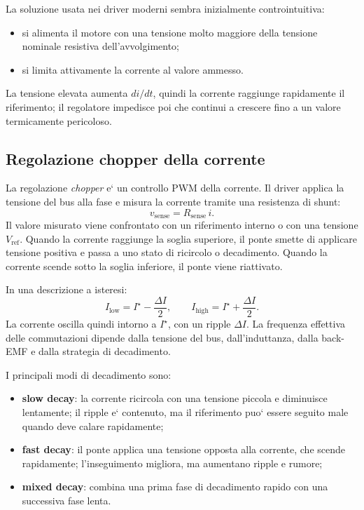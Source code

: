 \documentclass[11pt,a4paper]{article}
\begin{document}
La soluzione usata nei driver moderni sembra inizialmente controintuitiva:
\begin{itemize}
\item si alimenta il motore con una tensione molto maggiore della tensione nominale resistiva dell'avvolgimento;
\item si limita attivamente la corrente al valore ammesso.
\end{itemize}
La tensione elevata aumenta \(di/dt\), quindi la corrente raggiunge rapidamente il riferimento; il regolatore impedisce poi che continui a crescere fino a un valore termicamente pericoloso.

\subsection{Regolazione chopper della corrente}

La regolazione \emph{chopper} e` un controllo PWM della corrente. Il driver applica la tensione del bus alla fase e misura la corrente tramite una resistenza di shunt:
\[
v_{\text{sense}}=R_{\text{sense}}\,i.
\]
Il valore misurato viene confrontato con un riferimento interno o con una tensione \(V_{\text{ref}}\). Quando la corrente raggiunge la soglia superiore, il ponte smette di applicare tensione positiva e passa a uno stato di ricircolo o decadimento. Quando la corrente scende sotto la soglia inferiore, il ponte viene riattivato.

In una descrizione a isteresi:
\[
I_{\text{low}}
=I^\star-\frac{\Delta I}{2},
\qquad
I_{\text{high}}
=I^\star+\frac{\Delta I}{2}.
\]
La corrente oscilla quindi intorno a \(I^\star\), con un ripple \(\Delta I\). La frequenza effettiva delle commutazioni dipende dalla tensione del bus, dall'induttanza, dalla back-EMF e dalla strategia di decadimento.

I principali modi di decadimento sono:
\begin{itemize}
\item \textbf{slow decay}: la corrente ricircola con una tensione piccola e diminuisce lentamente; il ripple e` contenuto, ma il riferimento puo` essere seguito male quando deve calare rapidamente;
\item \textbf{fast decay}: il ponte applica una tensione opposta alla corrente, che scende rapidamente; l'inseguimento migliora, ma aumentano ripple e rumore;
\item \textbf{mixed decay}: combina una prima fase di decadimento rapido con una successiva fase lenta.
\end{itemize}
\end{document}
